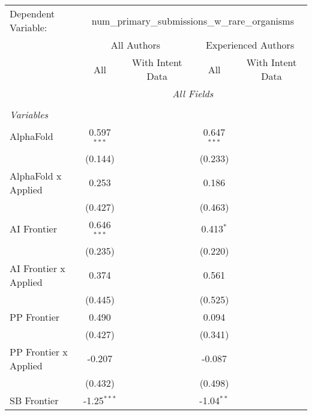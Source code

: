 \begingroup
\centering
\begin{tabular}{lcccccc}
   \tabularnewline \midrule \midrule
   Dependent Variable: & \multicolumn{6}{c}{num\_primary\_submissions\_w\_rare\_organisms}\\
 & \multicolumn{3}{c}{All Authors} & \multicolumn{3}{c}{Experienced Authors} \\
\cmidrule(lr){2-4} \cmidrule(lr){5-7}
 & \multicolumn{1}{c}{All} & \multicolumn{2}{c}{With Intent Data} & \multicolumn{1}{c}{All} & \multicolumn{2}{c}{With Intent Data} \\
\cmidrule(lr){2-2} \cmidrule(lr){3-4} \cmidrule(lr){5-5} \cmidrule(lr){6-7}
 & \multicolumn{6}{c}{\textit{All Fields}} \\ \\
   \emph{Variables}\\
   AlphaFold             & 0.597$^{***}$ &         &         & 0.647$^{***}$ &        &   \\   
                         & (0.144)       &         &         & (0.233)       &        &   \\   
   AlphaFold x Applied   & 0.253         &         &         & 0.186         &        &   \\   
                         & (0.427)       &         &         & (0.463)       &        &   \\   
   AI Frontier           & 0.646$^{***}$ &         &         & 0.413$^{*}$   &        &   \\   
                         & (0.235)       &         &         & (0.220)       &        &   \\   
   AI Frontier x Applied & 0.374         &         &         & 0.561         &        &   \\   
                         & (0.445)       &         &         & (0.525)       &        &   \\   
   PP Frontier           & 0.490         &         &         & 0.094         &        &   \\   
                         & (0.427)       &         &         & (0.341)       &        &   \\   
   PP Frontier x Applied & -0.207        &         &         & -0.087        &        &   \\   
                         & (0.432)       &         &         & (0.498)       &        &   \\   
   SB Frontier           & -1.25$^{***}$ &         &         & -1.04$^{**}$  &        &   \\   

\end{tabular}
